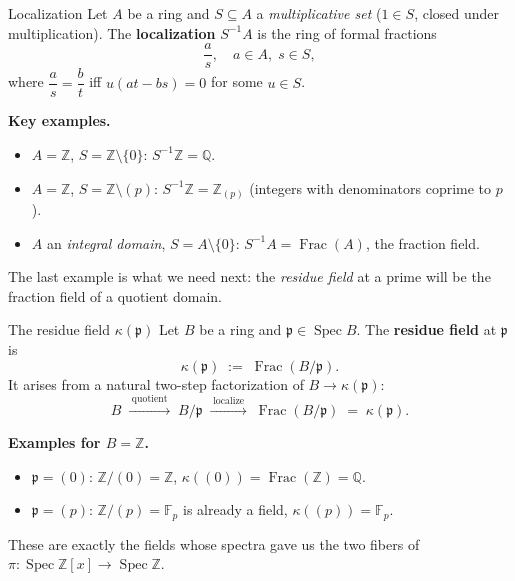 \documentclass[aspectratio=169,12pt]{beamer}
\begin{document}
\begin{frame}{Localization}
  Let $A$ be a ring and $S \subseteq A$ a \emph{multiplicative set}
  ($1 \in S$, closed under multiplication).
  The \textbf{localization} $S^{-1}A$ is the ring of formal fractions
  \[
    \frac{a}{s},\quad a \in A,\; s \in S,
  \]
  where $\dfrac{a}{s} = \dfrac{b}{t}$ iff $u(at - bs) = 0$ for some $u \in S$.

  \medskip

  \textbf{Key examples.}
  \begin{itemize}
    \item $A = \mathbb{Z}$,\; $S = \mathbb{Z}\setminus\{0\}$:\quad
          $S^{-1}\mathbb{Z} = \mathbb{Q}$.

    \item $A = \mathbb{Z}$,\; $S = \mathbb{Z}\setminus(p)$:\quad
          $S^{-1}\mathbb{Z} = \mathbb{Z}_{(p)}$
          (integers with denominators coprime to $p$).

    \item $A$ an \emph{integral domain},\;
          $S = A\setminus\{0\}$:\quad
          $S^{-1}A = \operatorname{Frac}(A)$, the fraction field.
  \end{itemize}

  \medskip
  The last example is what we need next:
  the \emph{residue field} at a prime will be the fraction field of a
  quotient domain.
\end{frame}

\begin{frame}{The residue field $\kappa(\mathfrak{p})$}
  Let $B$ be a ring and $\mathfrak{p} \in \operatorname{Spec} B$.
  The \textbf{residue field} at $\mathfrak{p}$ is
  \[
    \kappa(\mathfrak{p}) \;:=\; \operatorname{Frac}(B/\mathfrak{p}).
  \]
  It arises from a natural two-step factorization of $B \to \kappa(\mathfrak{p})$:
  \[
    B \;\xrightarrow{\;\text{quotient}\;}\; B/\mathfrak{p}
      \;\xrightarrow{\;\text{localize}\;}\;
      \operatorname{Frac}(B/\mathfrak{p}) \;=\; \kappa(\mathfrak{p}).
  \]

  \medskip

  \textbf{Examples for $B = \mathbb{Z}$.}
  \begin{itemize}
    \item $\mathfrak{p} = (0)$:\quad
          $\mathbb{Z}/(0) = \mathbb{Z}$,\;
          $\kappa((0)) = \operatorname{Frac}(\mathbb{Z}) = \mathbb{Q}$.

    \item $\mathfrak{p} = (p)$:\quad
          $\mathbb{Z}/(p) = \mathbb{F}_p$ is already a field,\;
          $\kappa((p)) = \mathbb{F}_p$.
  \end{itemize}

  \medskip
  These are exactly the fields whose spectra gave us the two fibers of
  $\pi : \operatorname{Spec}\mathbb{Z}[x] \to \operatorname{Spec}\mathbb{Z}$.
\end{frame}
\end{document}
